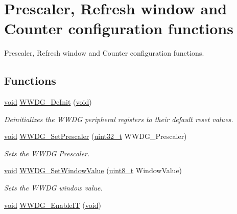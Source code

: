 \hypertarget{group___w_w_d_g___group1}{\section{Prescaler, Refresh window and Counter configuration functions}
\label{group___w_w_d_g___group1}
}


Prescaler, Refresh window and Counter configuration functions.  


\subsection*{Functions}
\begin{DoxyCompactItemize}
\item 
\hyperlink{group___n_a_m_e_ga18028b8badbf1ea7e704ccac3c488e82}{void} \hyperlink{group___w_w_d_g___group1_ga7130f4dc861b9234b62e73f9f57f89a1}{W\-W\-D\-G\-\_\-\-De\-Init} (\hyperlink{group___n_a_m_e_ga18028b8badbf1ea7e704ccac3c488e82}{void})
\begin{DoxyCompactList}\small\item\em Deinitializes the W\-W\-D\-G peripheral registers to their default reset values. \end{DoxyCompactList}\item 
\hyperlink{group___n_a_m_e_ga18028b8badbf1ea7e704ccac3c488e82}{void} \hyperlink{group___w_w_d_g___group1_gafeaa2b52c31ba7baca7eb61d2d42e07b}{W\-W\-D\-G\-\_\-\-Set\-Prescaler} (\hyperlink{stdint_8h_a435d1572bf3f880d55459d9805097f62}{uint32\-\_\-t} W\-W\-D\-G\-\_\-\-Prescaler)
\begin{DoxyCompactList}\small\item\em Sets the W\-W\-D\-G Prescaler. \end{DoxyCompactList}\item 
\hyperlink{group___n_a_m_e_ga18028b8badbf1ea7e704ccac3c488e82}{void} \hyperlink{group___w_w_d_g___group1_gaf44a7bf8bf6b11b41cd89ff521fdd5a5}{W\-W\-D\-G\-\_\-\-Set\-Window\-Value} (\hyperlink{stdint_8h_aba7bc1797add20fe3efdf37ced1182c5}{uint8\-\_\-t} Window\-Value)
\begin{DoxyCompactList}\small\item\em Sets the W\-W\-D\-G window value. \end{DoxyCompactList}\item 
\hyperlink{group___n_a_m_e_ga18028b8badbf1ea7e704ccac3c488e82}{void} \hyperlink{group___w_w_d_g___group1_gac8af66ea5254d3d78b60b9b7c7f29521}{W\-W\-D\-G\-\_\-\-Enable\-I\-T} (\hyperlink{group___n_a_m_e_ga18028b8badbf1ea7e704ccac3c488e82}{void})

\end{DoxyCompactItemize}
